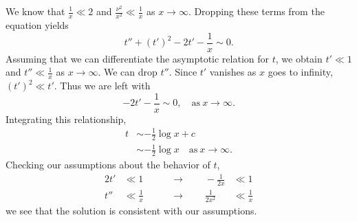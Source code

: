 \begin{Example}
  We know that $\frac{1}{x} \ll 2$ and $\frac{\nu^2}{x^2} \ll \frac{1}{x}$
  as $x \to \infty$.  Dropping these terms from the equation yields
  \[ t'' + (t')^2 - 2t' - \frac{1}{x} \sim 0.\]
  Assuming that we can differentiate the asymptotic relation for $t$, we obtain
  $t' \ll 1$ and $t'' \ll \frac{1}{x}$ as $x \to \infty$.  We
  can drop $t''$. Since $t'$ vanishes as $x$ goes to infinity, $(t')^2 \ll t'$.
  Thus we are left with 
  \[ - 2t' - \frac{1}{x} \sim 0, \quad \mathrm{as}\ x \to \infty.\]
  Integrating this relationship,
  \begin{align*}
    t &\sim -\frac{1}{2} \log x + c \\
    &\sim -\frac{1}{2} \log x \quad \mathrm{as}\ x \to \infty.
  \end{align*}
  Checking our assumptions about the behavior of $t$,
  \begin{alignat*}{2}
    t' &\ll 1 \qquad &\to \qquad -\frac{1}{2x} &\ll 1 \\
    t'' &\ll \frac{1}{x} \qquad &\to \qquad \frac{1}{2x^2} &\ll \frac{1}{x}
  \end{alignat*}
  we see that the solution is consistent with our assumptions.


\end{Example}
